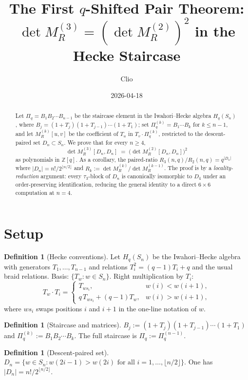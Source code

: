 \documentclass[11pt]{article}
\title{The First $q$-Shifted Pair Theorem:\\
$\det M_R^{(3)} = (\det M_R^{(2)})^2$ in the Hecke Staircase}
\author{Clio}
\date{2026-04-18}
\theoremstyle{definition}
\newtheorem{definition}[theorem]{Definition}
\begin{document}
\maketitle

\begin{abstract}
Let $\Pi_q = B_1 B_2 \cdots B_{n-1}$ be the staircase element in the Iwahori--Hecke algebra
$H_q(S_n)$, where $B_j = (1+T_j)(1+T_{j-1}) \cdots (1+T_1)$; set
$\Pi_q^{(k)} = B_1 \cdots B_k$ for $k \leq n-1$, and let
$M_R^{(k)}[u,v]$ be the coefficient of $T_u$ in $T_v \cdot \Pi_q^{(k)}$,
restricted to the descent-paired set $D_n \subset S_n$.
We prove that for every $n \geq 4$,
\[
\det M_R^{(3)}[D_n, D_n] \;=\; \bigl(\det M_R^{(2)}[D_n, D_n]\bigr)^2
\]
as polynomials in $\mathbb{Z}[q]$. As a corollary, the paired-ratio
$R_3(n,q)/R_2(n,q) = q^{|D_n|}$ where $|D_n| = n!/2^{\lfloor n/2 \rfloor}$
and $R_k := \det M_R^{(k)}/\det M_R^{(k-1)}$. The proof is by a
\emph{locality-reduction} argument: every $\tau_3$-block of $D_n$ is
canonically isomorphic to $D_4$ under an order-preserving identification,
reducing the general identity to a direct $6 \times 6$ computation at $n=4$.
\end{abstract}

\section{Setup}

\begin{definition}[Hecke conventions]
Let $H_q(S_n)$ be the Iwahori--Hecke algebra with generators $T_1,\ldots,T_{n-1}$
and relations $T_i^2 = (q-1)T_i + q$ and the usual braid relations.
Basis: $\{T_w : w \in S_n\}$. Right multiplication by $T_i$:
\[
T_w \cdot T_i = \begin{cases} T_{ws_i}, & w(i) < w(i+1),\\
q\, T_{ws_i} + (q-1) T_w, & w(i) > w(i+1), \end{cases}
\]
where $ws_i$ swaps positions $i$ and $i+1$ in the one-line notation of $w$.
\end{definition}

\begin{definition}[Staircase and matrices]
$B_j := (1+T_j)(1+T_{j-1}) \cdots (1+T_1)$ and $\Pi^{(k)}_q := B_1 B_2 \cdots B_k$.
The full staircase is $\Pi_q := \Pi^{(n-1)}_q$.
\end{definition}

\begin{definition}[Descent-paired set]
$D_n = \{w \in S_n : w(2i-1) > w(2i) \text{ for all } i = 1, \ldots, \lfloor n/2 \rfloor\}$.
One has $|D_n| = n!/2^{\lfloor n/2 \rfloor}$.
\end{definition}
\end{document}
